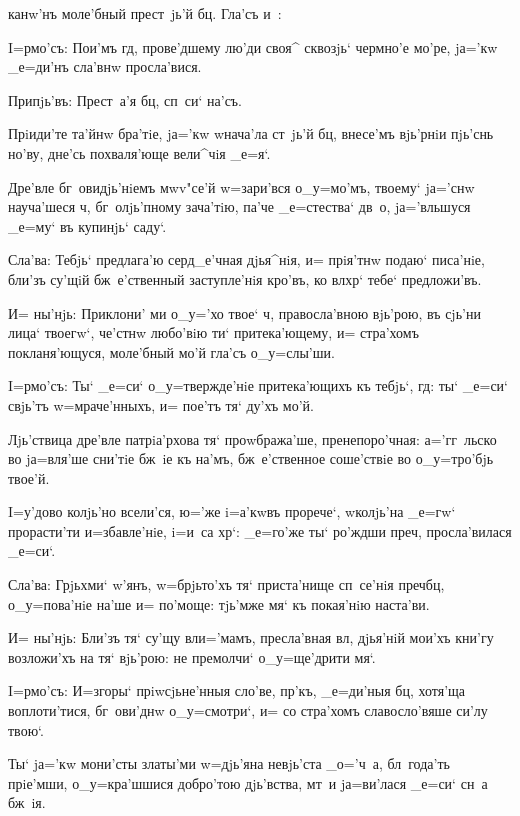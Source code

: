 
канw'нъ моле'бный прест~jь'й бц. Гла'съ и~:


I=рмо'съ: Пои'мъ гд, прове'дшему лю'ди своя^ 
сквозjь` чермно'е мо'ре, jа='кw _е=ди'нъ сла'внw 
просла'вися.

Припjь'въ: Прест~а'я бц, сп~си` на'съ.

Прiиди'те та'йнw бра'тiе, jа='кw w\т нача'ла ст~jь'й 
бц, внесе'мъ вjь'рнiи пjь'снь но'ву, дне'сь 
похваля'юще вели^чiя _е=я`.

Дре'вле бг~овидjь'нiемъ мwv"се'й w=зари'вся о_у=мо'мъ, 
твоему` jа='снw науча'шеся ч, бг~олjь'пному 
зача'тiю, па'че _е=стества` дв~о, jа='вльшуся _е=му` въ 
купинjь` саду`.

Сла'ва: Тебjь` предлага'ю серд_е'чная дjья^нiя, и= 
прiя'тнw подаю` писа'нiе, бли'зъ су'щiй бж~е'ственный 
заступле'нiя кро'въ, ко вл хр` тебе` 
предложи'въ.

И= ны'нjь: Приклони' ми о_у='хо твое` ч, 
правосла'вною вjь'рою, въ сjь'ни лица` твоегw`, че'стнw 
любо'вiю ти` притека'ющему, и= стра'хомъ покланя'ющуся, 
моле'бный мо'й гла'съ о_у=слы'ши.


I=рмо'съ: Ты` _е=си` о_у=твержде'нiе притека'ющихъ къ 
тебjь`, гд: ты` _е=си` свjь'тъ w=мраче'нныхъ, и= 
пое'тъ тя` ду'хъ мо'й.

Лjь'ствица дре'вле патрiа'рхова тя` проwбража'ше, 
пренепоро'чная: а='гг~льско во jа=вля'ше сни'тiе бж~iе къ 
на'мъ, бж~е'ственное соше'ствiе во о_у=тро'бjь твое'й.

I=у'дово колjь'но всели'ся, ю='же i=а'кwвъ прорече`, 
w\т колjь'на _е=гw` прорасти'ти и=збавле'нiе, i=и~са 
хр`: _е=го'же ты` ро'ждши преч, просла'вилася 
_е=си`.

Сла'ва: Грjьхми` w'янъ, w=брjьто'хъ тя` 
приста'нище сп~се'нiя преч бц, о_у=пова'нiе на'ше 
и= по'моще: тjь'мже мя` къ покая'нiю наста'ви.

И= ны'нjь: Бли'зъ тя` су'щу вл и='мамъ, 
пресла'вная вл, дjья'нiй мои'хъ кни'гу возложи'хъ на 
тя` вjь'рою: не премолчи` о_у=ще'дрити мя`.


I=рмо'съ: И=з\ъ горы` прiwсjьне'нныя сло'ве, 
пр'къ, _е=ди'ныя бц, хотя'ща воплоти'тися, 
бг~ови'днw о_у=смотри`, и= со стра'хомъ славосло'вяше 
си'лу твою`.

Ты` jа='кw мони'сты златы'ми w=дjь'яна невjь'ста 
_о='ч~а, бл~года'ть прiе'мши, о_у=кра'шшися добро'тою 
дjь'вства, мт~и jа=ви'лася _е=си` сн~а бж~iя.

